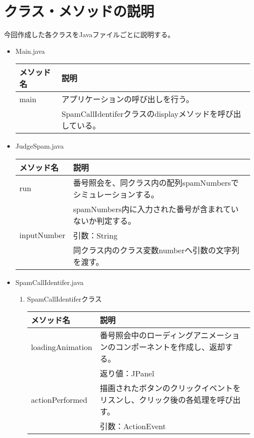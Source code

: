 \documentclass[dvipdfmx, titlepage]{jsarticle}
\begin{document}
\section{クラス・メソッドの説明}
今回作成した各クラスをJavaファイルごとに説明する。
\begin{itemize}
  \item Main.java
  \begin{table}[H]
  \begin{tabular}{|l|l|} \hline
  メソッド名 & 説明                                                         \\ \hline
  main  & アプリケーションの呼び出しを行う。\\
  &SpamCallIdentiferクラスのdisplayメソッドを呼び出している。\\ \hline
  \end{tabular}
\end{table}
  \item JudgeSpam.java
  \begin{table}[H]
  \begin{tabular}{|l|l|} \hline
  メソッド名       & 説明                                                                                        \\ \hline
  run         & 番号照会を、同クラス内の配列spamNumbersでシミュレーションする。
  \\&spamNumbers内に入力された番号が含まれていないか判定する。 \\ \hline
  inputNumber & 引数：String
  \\&同クラス内のクラス変数numberへ引数の文字列を渡す。    \\ \hline
  \end{tabular}
\end{table}
  \item SpamCallIdentifer.java
  \begin{enumerate}
    \item  SpamCallIdentiferクラス
    \begin{table}[H]
\begin{tabular}{|l|l|} \hline
メソッド名            & 説明                                                                     \\ \hline
loadingAnimation & 番号照会中のローディングアニメーションのコンポーネントを作成し、返却する。\\&返り値：JPanel      \\ \hline
actionPerformed  & 描画されたボタンのクリックイベントをリスンし、クリック後の各処理を呼び出す。\\&引数：ActionEvent \\ \hline

\end{tabular}
\end{table}
\end{enumerate}
\end{itemize}
\end{document}
